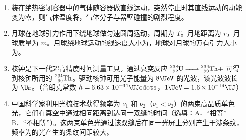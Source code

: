 \documentclass[\gkver]{gaokaozhenti}
\begin{document}
\begin{enumerate}
{由牛顿第二定律可得：

$F - F_{\text{安}} = -ma$

$F = -ma + F_{\text{安}}$

可见，$F-t$ 图像的斜率与 $F_{\text{安}}$ 的斜率大小相同，并在 $F_{\text{安}}$ 大小图线的基础上向下平移 $ma$ 的距离。

正确选项为 C。
}

\item
装在绝热密闭容器中的气体随容器做直线运动，突然停止时其直线运动的动能变为零，则气体温度将，气体分子与器壁碰撞的剧烈程度。

\item
月球在地球引力作用下绕地球做匀速圆周运动，周期为 $T$。月地距离为 $r$，月球质量为 $m$。月球绕地球运动的线速度大小为，地球对月球的万有引力大小为。

\item
核钟是下一代超高精度时间测量工具，通过衰变反应 $\ce{^{238}_{92}U -> ^{234}_{90}Th} +$  可得到核钟所用的 $\ce{^{234}_{90}Th}$。驱动核钟可用光子能量为 $8 \UeV$ 的光波，该光波波长为 $\Um$。（普朗克常数 $h = 6.63\times10^{-34} \UJcdots$，$1 \UeV = 1.6\times10^{-19} \UJ$）

\item
中国科学家利用光梳技术获得频率为 $\nu_{1}$ 和 $\nu_{2}$（$\nu_{1} < \nu_{2}$）的两束高品质单色光，它们在真空中通过相同距离到达同一双缝的时间（选填：A．“相等”   B．“不相等”）。这两束单色光通过该双缝后在同一光屏上分别产生干涉条纹，频率为的光产生的条纹间距较大。


\end{enumerate}
\end{document}

